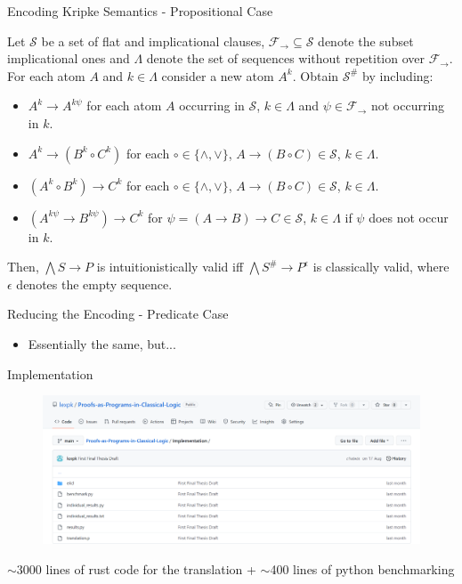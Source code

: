 \documentclass{cubeamer}
\begin{document}
	\begin{frame}{Encoding Kripke Semantics - Propositional Case}
		\begin{theorem}
			\label{thm:reduction-propositional}
			Let $\mathcal S$ be a set of flat and implicational clauses, $\mathcal F_\to\subseteq\mathcal S$ denote the subset implicational ones and $\Lambda$ denote the set of sequences without repetition over $\mathcal F_\to$. For each atom $A$ and $k\in\Lambda$ consider a new atom $A^k$. Obtain $\mathcal S^\#$ by including:
			\begin{itemize}
				\item $A^k\to A^{k\psi}$ for each atom $A$ occurring in $\mathcal S$, $k\in\Lambda$ and $\psi\in\mathcal F_\to$ not occurring in $k$.
				\item $A^k\to (B^k\circ C^k)$ for each $\circ\in\{\wedge,\vee\}$, $A\to (B\circ C)\in\mathcal S$, $k\in\Lambda$.
				\item $(A^k\circ B^k)\to C^k$ for each $\circ\in\{\wedge,\vee\}$, $A\to (B\circ C)\in\mathcal S$, $k\in\Lambda$.
				\item $(A^{k\psi}\to B^{k\psi})\to C^k$ for $\psi = (A\to B)\to C\in\mathcal S$, $k\in\Lambda$ if $\psi$ does not occur in $k$.
			\end{itemize}
			Then, $\bigwedge S\to P$ is intuitionistically valid iff $\bigwedge S^\#\to P^\epsilon$ is classically valid, where $\epsilon$ denotes the empty sequence.
		\end{theorem}
	\end{frame}
	
	\begin{frame}{Reducing the Encoding - Predicate Case}
		\begin{itemize}
			\item Essentially the same, but...
		\end{itemize}
	\end{frame}

	
	\begin{frame}{Implementation}
		\centering
		\begin{figure}
			\includegraphics[width=\textwidth]{implementation.png}
		\end{figure}
		$\sim$3000 lines of rust code for the translation + $\sim$400 lines of python benchmarking
	\end{frame}
\end{document}

